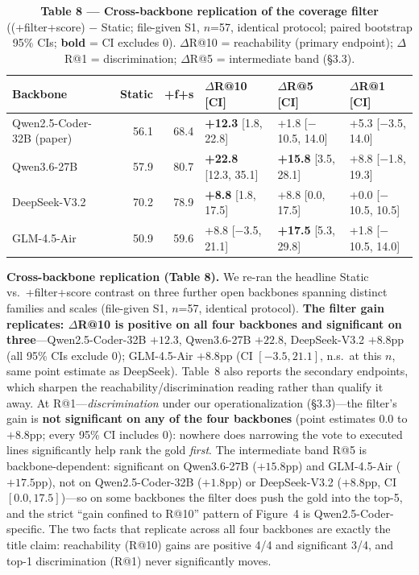 \documentclass[11pt]{article}
\begin{document}
\begin{table}[t]
\centering\small
\caption*{\textbf{Table 8 --- Cross-backbone replication of the coverage filter} ((+filter+score) $-$ Static; file-given S1, $n$=57, identical protocol; paired bootstrap 95\% CIs; \textbf{bold} = CI excludes 0). $\Delta$R@10 = reachability (primary endpoint); $\Delta$R@1 = discrimination; $\Delta$R@5 = intermediate band (\S3.3).}
\setlength{\tabcolsep}{3pt}\footnotesize
\begin{tabular}{lrrlll}
\toprule
Backbone & Static & +f+s & $\Delta$R@10 [CI] & $\Delta$R@5 [CI] & $\Delta$R@1 [CI] \\
\midrule
Qwen2.5-Coder-32B (paper) & 56.1 & 68.4 & \textbf{+12.3} [1.8, 22.8] & +1.8 [$-$10.5, 14.0] & +5.3 [$-$3.5, 14.0] \\
Qwen3.6-27B & 57.9 & 80.7 & \textbf{+22.8} [12.3, 35.1] & \textbf{+15.8} [3.5, 28.1] & +8.8 [$-$1.8, 19.3] \\
DeepSeek-V3.2 & 70.2 & 78.9 & \textbf{+8.8} [1.8, 17.5] & +8.8 [0.0, 17.5] & +0.0 [$-$10.5, 10.5] \\
GLM-4.5-Air & 50.9 & 59.6 & +8.8 [$-$3.5, 21.1] & \textbf{+17.5} [5.3, 29.8] & +1.8 [$-$10.5, 14.0] \\
\bottomrule
\end{tabular}
\end{table}

\smallskip\noindent\textbf{Cross-backbone replication (Table 8).} We re-ran the headline Static vs.\ +filter+score contrast on three further open backbones spanning distinct families and scales (file-given S1, $n$=57, identical protocol). \textbf{The filter gain replicates: $\Delta$R@10 is positive on all four backbones and significant on three}---Qwen2.5-Coder-32B $+12.3$, Qwen3.6-27B $+22.8$, DeepSeek-V3.2 $+8.8$pp (all 95\% CIs exclude 0); GLM-4.5-Air $+8.8$pp (CI $[-3.5,21.1]$, n.s.\ at this $n$, same point estimate as DeepSeek). Table~8 also reports the secondary endpoints, which sharpen the reachability/discrimination reading rather than qualify it away. At R@1---\emph{discrimination} under our operationalization (\S3.3)---the filter's gain is \textbf{not significant on any of the four backbones} (point estimates $0.0$ to $+8.8$pp; every 95\% CI includes 0): nowhere does narrowing the vote to executed lines significantly help rank the gold \emph{first}. The intermediate band R@5 is backbone-dependent: significant on Qwen3.6-27B ($+15.8$pp) and GLM-4.5-Air ($+17.5$pp), not on Qwen2.5-Coder-32B ($+1.8$pp) or DeepSeek-V3.2 ($+8.8$pp, CI $[0.0,17.5]$)---so on some backbones the filter does push the gold into the top-5, and the strict ``gain confined to R@10'' pattern of Figure~4 is Qwen2.5-Coder-specific. The two facts that replicate across all four backbones are exactly the title claim: reachability (R@10) gains are positive 4/4 and significant 3/4, and top-1 discrimination (R@1) never significantly moves.
\end{document}
